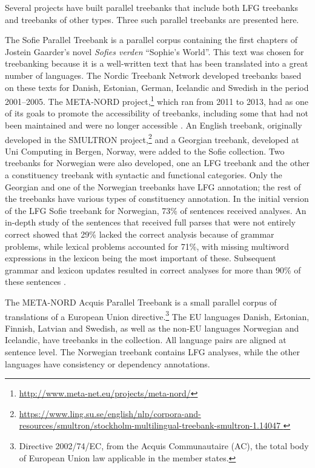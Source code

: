 \documentclass[output=paper,hidelinks]{langscibook}
\begin{document}
Several projects have built parallel treebanks that include both LFG treebanks and treebanks of other types.
Three such parallel treebanks are presented here.

The Sofie Parallel Treebank is a parallel corpus containing the first chapters of Jostein Gaarder's novel \textit{Sofies verden} ``Sophie's World''.
This text was chosen for treebanking because it is a well-written text that has been translated into a great number of languages.
The Nordic Treebank Network developed treebanks based on these texts for Danish, Estonian, German, Icelandic and Swedish in the period 2001–2005.
The META-NORD project,\footnote{\url{http://www.meta-net.eu/projects/meta-nord/}} which ran from 2011 to 2013, had as one of its goals to promote the accessibility of treebanks, including some that had not been maintained and were no longer accessible \citep{Losnegaard13}.
An English treebank, originally developed in the SMULTRON project,\footnote{\url{https://www.ling.su.se/english/nlp/corpora-and-resources/smultron/stockholm-multilingual-treebank-smultron-1.14047
}} and a Georgian treebank, developed at Uni Computing in Bergen, Norway, were added to the Sofie collection.
Two treebanks for Norwegian were also developed, one an LFG treebank and the other a constituency treebank with syntactic and functional categories.
Only the Georgian and one of the Norwegian treebanks have LFG annotation; the rest of the treebanks have various types of constituency annotation.
In the initial version of the LFG Sofie treebank for Norwegian, 73\% of sentences received analyses.
An in-depth study of the sentences that received full parses that were not entirely correct showed that 29\% lacked the correct analysis because of grammar problems, while lexical problems accounted for 71\%, with missing multiword expressions in the lexicon being the most important of these.
Subsequent grammar and lexicon updates resulted in correct analyses for more than 90\% of these sentences \citep{Losnegaard12}. %

The META-NORD Acquis Parallel Treebank is a small parallel corpus of translations of a European Union directive.\footnote{Directive 2002/74/EC, from the Acquis Communautaire (AC), the total body of European Union law applicable in the member states.}
The EU languages Danish, Estonian, Finnish, Latvian and Swedish, as well as the non-EU languages Norwegian and Icelandic, have treebanks in the collection.
All language pairs are aligned at sentence level.
The Norwegian treebank contains LFG analyses, while the other languages have consistency or dependency annotations.
\end{document}
